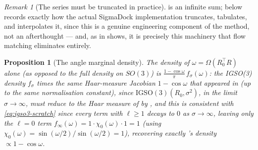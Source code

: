 \documentclass[11pt,a4paper]{report}
\newtheorem{proposition}[proposition]{Proposition}
\theoremstyle{definition}
\theoremstyle{remark}
\newtheorem{remark}[remark]{Remark}
\begin{document}
\begin{remark}[The series must be truncated in practice]
\label{rem:igso3-truncation}
 is an infinite sum; 
below records exactly how the actual SigmaDock implementation truncates,
tabulates, and interpolates it, since this is a genuine engineering
component of the method, not an afterthought --- and, as
 in  shows, it is
precisely this machinery that flow matching eliminates entirely.
\end{remark}

\begin{proposition}[The angle marginal density]
\label{prop:igso3-angle-marginal}
The density of $\omega=\Omega(R_0^\top R)$ alone (as opposed to the full
density on $SO(3)$) is $\tfrac{1-\cos\omega}\pi\,f_\sigma(\omega)$: the
IGSO(3) density $f_\sigma$ times the same Haar-measure Jacobian
$1-\cos\omega$ that appeared in  (up to the same
normalisation constant), since $\mathrm{IGSO}(3)(R_0,\sigma^2)$, in the
limit $\sigma\to\infty$, must reduce to the Haar measure of
 by , and this is
consistent with \eqref{eq:igso3-scratch} since every term with $\ell\ge1$
decays to $0$ as $\sigma\to\infty$, leaving only the $\ell=0$ term
$f_\infty(\omega)=1\cdot\chi_0(\omega)\cdot1 = 1$ (using
$\chi_0(\omega)=\sin(\omega/2)/\sin(\omega/2)=1$), recovering exactly
's density $\propto1-\cos\omega$.
\end{proposition}
\end{document}
